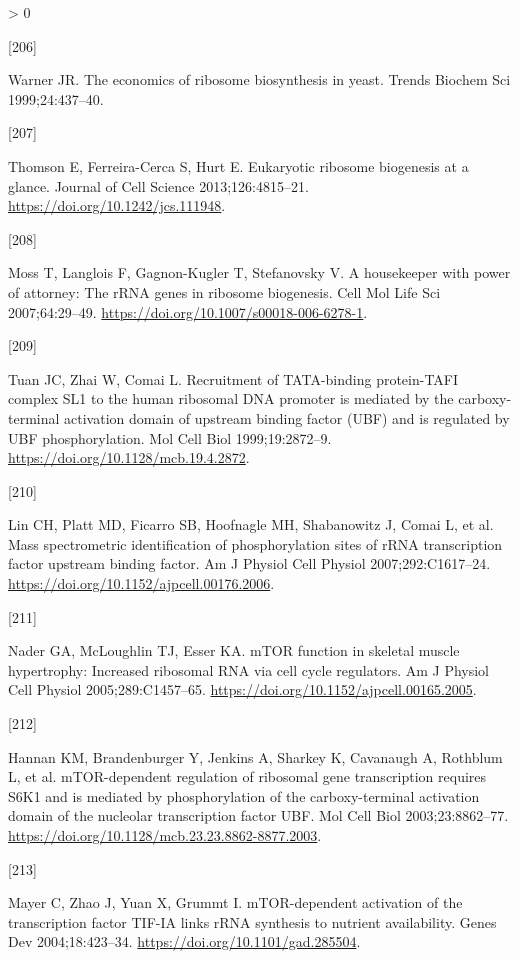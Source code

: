 \documentclass[twoside,10pt]{gihclass} %
\newlength{\cslhangindent}
\newlength{\csllabelwidth}
\newenvironment{CSLReferences}[3] %
 {%
  \setlength{\parindent}{0pt}
  \ifodd #1 \everypar{\setlength{\hangindent}{\cslhangindent}}\ignorespaces\fi
  \ifnum #2 > 0
  \setlength{\parskip}{#2\baselineskip}
  \fi
 }%
 {}
\newcommand{\CSLLeftMargin}[1]{\parbox[t]{\maxof{\widthof{#1}}{\csllabelwidth}}{#1}}
\newcommand{\CSLRightInline}[1]{\parbox[t]{\linewidth}{#1}}
\begin{document}
\begin{CSLReferences}{0}{0}
\leavevmode\hypertarget{ref-RN1920}{}%
\CSLLeftMargin{{[}206{]} }
\CSLRightInline{Warner JR. The economics of ribosome biosynthesis in yeast. Trends Biochem Sci 1999;24:437--40.}

\leavevmode\hypertarget{ref-RN1940}{}%
\CSLLeftMargin{{[}207{]} }
\CSLRightInline{Thomson E, Ferreira-Cerca S, Hurt E. Eukaryotic ribosome biogenesis at a glance. Journal of Cell Science 2013;126:4815--21. \url{https://doi.org/10.1242/jcs.111948}.}

\leavevmode\hypertarget{ref-RN1820}{}%
\CSLLeftMargin{{[}208{]} }
\CSLRightInline{Moss T, Langlois F, Gagnon-Kugler T, Stefanovsky V. A housekeeper with power of attorney: The rRNA genes in ribosome biogenesis. Cell Mol Life Sci 2007;64:29--49. \url{https://doi.org/10.1007/s00018-006-6278-1}.}

\leavevmode\hypertarget{ref-RN2582}{}%
\CSLLeftMargin{{[}209{]} }
\CSLRightInline{Tuan JC, Zhai W, Comai L. Recruitment of TATA-binding protein-TAFI complex SL1 to the human ribosomal DNA promoter is mediated by the carboxy-terminal activation domain of upstream binding factor (UBF) and is regulated by UBF phosphorylation. Mol Cell Biol 1999;19:2872--9. \url{https://doi.org/10.1128/mcb.19.4.2872}.}

\leavevmode\hypertarget{ref-RN2563}{}%
\CSLLeftMargin{{[}210{]} }
\CSLRightInline{Lin CH, Platt MD, Ficarro SB, Hoofnagle MH, Shabanowitz J, Comai L, et al. Mass spectrometric identification of phosphorylation sites of rRNA transcription factor upstream binding factor. Am J Physiol Cell Physiol 2007;292:C1617--24. \url{https://doi.org/10.1152/ajpcell.00176.2006}.}

\leavevmode\hypertarget{ref-RN1632}{}%
\CSLLeftMargin{{[}211{]} }
\CSLRightInline{Nader GA, McLoughlin TJ, Esser KA. mTOR function in skeletal muscle hypertrophy: Increased ribosomal RNA via cell cycle regulators. Am J Physiol Cell Physiol 2005;289:C1457--65. \url{https://doi.org/10.1152/ajpcell.00165.2005}.}

\leavevmode\hypertarget{ref-RN2564}{}%
\CSLLeftMargin{{[}212{]} }
\CSLRightInline{Hannan KM, Brandenburger Y, Jenkins A, Sharkey K, Cavanaugh A, Rothblum L, et al. mTOR-dependent regulation of ribosomal gene transcription requires S6K1 and is mediated by phosphorylation of the carboxy-terminal activation domain of the nucleolar transcription factor UBF. Mol Cell Biol 2003;23:8862--77. \url{https://doi.org/10.1128/mcb.23.23.8862-8877.2003}.}

\leavevmode\hypertarget{ref-RN2851}{}%
\CSLLeftMargin{{[}213{]} }
\CSLRightInline{Mayer C, Zhao J, Yuan X, Grummt I. mTOR-dependent activation of the transcription factor TIF-IA links rRNA synthesis to nutrient availability. Genes Dev 2004;18:423--34. \url{https://doi.org/10.1101/gad.285504}.}


\end{CSLReferences}
\end{document}
